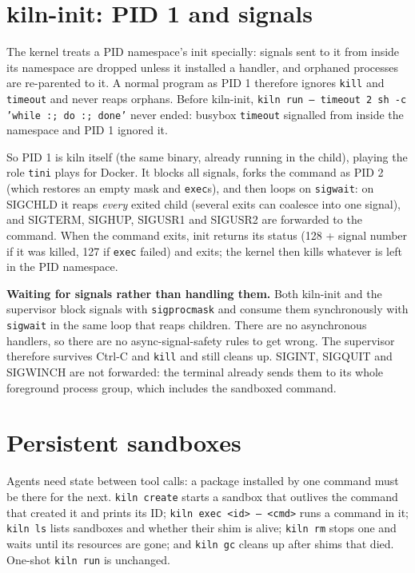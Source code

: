\documentclass[10pt,letterpaper]{article}
\newcommand{\code}[1]{\texttt{#1}}
\begin{document}
\section{kiln-init: PID 1 and signals}

The kernel treats a PID namespace's init specially: signals sent to it from
inside its namespace are dropped unless it installed a handler, and orphaned
processes are re-parented to it. A normal program as PID 1 therefore ignores
\code{kill} and \code{timeout} and never reaps orphans. Before kiln-init,
\code{kiln run -- timeout 2 sh -c 'while :; do :; done'} never ended: busybox
\code{timeout} signalled from inside the namespace and PID 1 ignored it.

So PID 1 is kiln itself (the same binary, already running in the child), playing
the role \code{tini} plays for Docker. It blocks all signals, forks the command
as PID 2 (which restores an empty mask and \code{exec}s), and then loops on
\code{sigwait}: on SIGCHLD it reaps \emph{every} exited child (several exits can
coalesce into one signal), and SIGTERM, SIGHUP, SIGUSR1 and SIGUSR2 are forwarded
to the command. When the command exits, init returns its status (128 + signal
number if it was killed, 127 if \code{exec} failed) and exits; the kernel then
kills whatever is left in the PID namespace.

\textbf{Waiting for signals rather than handling them.} Both kiln-init and the
supervisor block signals with \code{sigprocmask} and consume them synchronously
with \code{sigwait} in the same loop that reaps children. There are no
asynchronous handlers, so there are no async-signal-safety rules to get wrong.
The supervisor therefore survives Ctrl-C and \code{kill} and still cleans up.
SIGINT, SIGQUIT and SIGWINCH are not forwarded: the terminal already sends them
to its whole foreground process group, which includes the sandboxed command.

\section{Persistent sandboxes}
\label{sec:persistent}

Agents need state between tool calls: a package installed by one command must
be there for the next. \code{kiln create} starts a sandbox that outlives the
command that created it and prints its ID; \code{kiln exec <id> -- <cmd>} runs a
command in it; \code{kiln ls} lists sandboxes and whether their shim is alive;
\code{kiln rm} stops one and waits until its resources are gone; and \code{kiln
gc} cleans up after shims that died. One-shot \code{kiln run} is unchanged.
\end{document}
